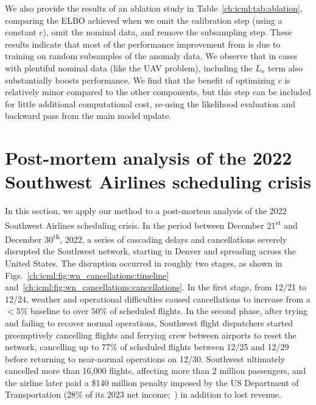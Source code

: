 We also provide the results of an ablation study in Table~\ref{ch:icml:tab:ablation}, comparing the ELBO achieved when we omit the calibration step (using a constant $c$), omit the nominal data, and remove the subsampling step. These results indicate that most of the performance improvement from \ouralg{} is due to training on random subsamples of the anomaly data. We observe that in cases with plentiful nominal data (like the UAV problem), including the $L_n$ term also substantially boosts performance. We find that the benefit of optimizing $c$ is relatively minor compared to the other components, but this step can be included for little additional computational cost, re-using the likelihood evaluation and backward pass from the main model update.

\section{Post-mortem analysis of the 2022 Southwest Airlines scheduling crisis}\label{ch:icml:wn-case-study}

In this section, we apply our method to a post-mortem analysis of the 2022 Southwest Airlines scheduling crisis. In the period between December 21\textsuperscript{st} and December 30\textsuperscript{th}, 2022, a series of cascading delays and cancellations severely disrupted the Southwest network, starting in Denver and spreading across the United States. The disruption occurred in roughly two stages, as shown in Figs.~\ref{ch:icml:fig:wn_cancellations:timeline} and~\ref{ch:icml:fig:wn_cancellations:cancellations}. In the first stage, from 12/21 to 12/24, weather and operational difficulties caused cancellations to increase from a $< 5\%$ baseline to over $50\%$ of scheduled flights. In the second phase, after trying and failing to recover normal operations, Southwest flight dispatchers started preemptively cancelling flights and ferrying crew between airports to reset the network, cancelling up to $77\%$ of scheduled flights between 12/25 and 12/29 before returning to near-normal operations on 12/30. Southwest ultimately cancelled more than 16,000 flights, affecting more than 2 million passengers, and the airline later paid a \$140 million penalty imposed by the US Department of Transportation ($28\%$ of its 2023 net income;~\cite{roseSouthwestWillPay2023}) in addition to lost revenue.

